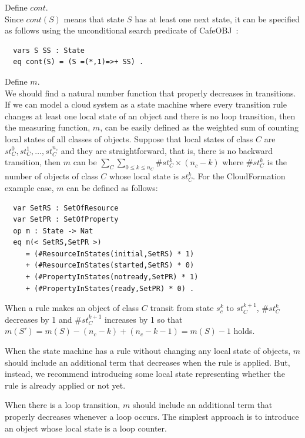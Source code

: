 \documentclass[12pt]{report}
\newcommand{\cafeobj}{{\sf CafeOBJ}~}
\begin{document}
 Define $cont$. \\ Since $cont(S)$ means that
state $S$ has at least one next state, it can be specified as follows
using the unconditional search predicate of \cafeobj:
\small
\begin{verbatim}
  vars S SS : State
  eq cont(S) = (S =(*,1)=>+ SS) .
\end{verbatim}
\normalsize
 Define $m$. \\ We should find a natural
number function that properly decreases in transitions. If we can
model a cloud system as a state machine where every transition rule
changes at least one local state of an object and there is no loop
transition, then the measuring function, $m$, can be easily defined as
the weighted sum of counting local states of all classes of objects.
Suppose that local states of class $C$ are $st_C^0, st_C^1, \dots ,
st_C^{n_c}$ and they are straightforward, that is, there is no
backward transition, then $m$ can be $\sum_{C} \sum_{0 \le k \le n_C}
\#st_C^k \times (n_c - k)$ where $\#st_C^k$ is the number of objects
of class $C$ whose local state is $st_C^k$. For the CloudFormation
example case, $m$ can be defined as follows:
\small
\begin{verbatim}
  var SetRS : SetOfResource
  var SetPR : SetOfProperty
  op m : State -> Nat
  eq m(< SetRS,SetPR >)
     = (#ResourceInStates(initial,SetRS) * 1) 
     + (#ResourceInStates(started,SetRS) * 0)
     + (#PropertyInStates(notready,SetPR) * 1) 
     + (#PropertyInStates(ready,SetPR) * 0) .
\end{verbatim}
\normalsize
When a rule makes an object of class $C$ transit from state $s_c^k$ to
$st_C^{k+1}$, $\#st_C^k$ decreases by 1 and $\#st_C^{k+1}$ increases by 1 so that
$m(S')=m(S)-(n_c-k)+(n_c-k-1)=m(S)-1$ holds.

When the state machine has a rule without changing any local state
of objects, $m$ should include an additional term that decreases when
the rule is applied. But, instead, we recommend introducing some local
state representing whether the rule is already applied or not yet.

When there is a loop transition, $m$ should include an additional term
that properly decreases whenever a loop occurs. The simplest approach
is to introduce an object whose local state is a loop counter.\\
\end{document}
